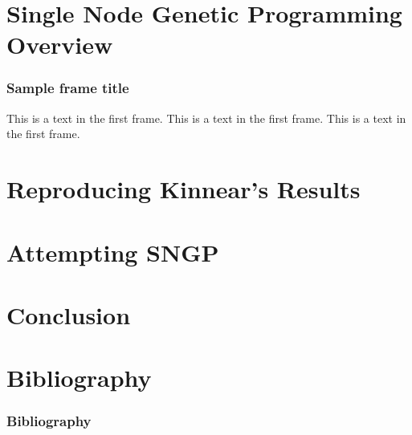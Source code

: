 \documentclass{beamer}
\begin{document}
	
	\section{Single Node Genetic Programming Overview}

		\begin{frame}
			\frametitle{Sample frame title}
			This is a text in the first frame. This is a text in the first frame. This is a text in the first frame.
		\end{frame}
	
	\section{Reproducing Kinnear's Results}
	
	\section{Attempting SNGP}
	
	\section{Conclusion}
	
	\section{Bibliography}
	
		\begin{frame}
			\frametitle{Bibliography}
			
			
		\end{frame}
		
\end{document}
